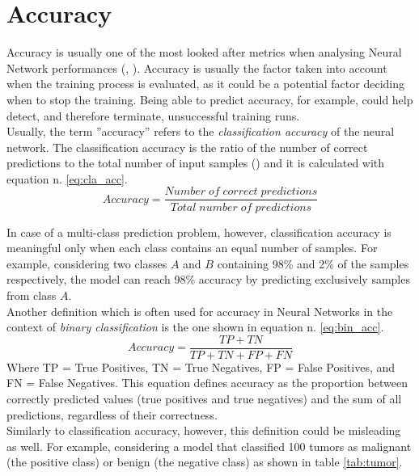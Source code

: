 \section{Accuracy}\label{sec:accuracy}
Accuracy is usually one of the most looked after metrics when analysing Neural Network performances (\cite{hendrycks2019benchmarking}, \cite{bianco2018dnnsbench}). Accuracy is usually the factor taken into account when the training process is evaluated, as it could be a potential factor deciding when to stop the training. Being able to predict accuracy, for example, could help detect, and therefore terminate, unsuccessful training runs. \cite{unterthiner2021predicting} \\
 Usually, the term ''accuracy''  refers to the \textit{classification accuracy} of the neural network. The classification accuracy is the ratio of the number of correct predictions to the total number of input samples (\cite{hussein}) and it is calculated with equation n. \ref{eq:cla_acc}.
\begin{equation}
Accuracy = \dfrac{Number\;of\;correct\;predictions}{Total\;number\;of\;predictions}
\label{eq:cla_acc}    
\end{equation}

In case of a multi-class prediction problem, however, classification accuracy is meaningful only when each class contains an equal number of samples. For example, considering two classes $A$ and $B$ containing 98\% and 2\% of the samples respectively, the model can reach 98\% accuracy by predicting exclusively samples from class $A$. \\
Another definition which is often used for accuracy in Neural Networks in the context of \textit{binary classification} is the one shown in equation n. \ref{eq:bin_acc}.
 \begin{equation}
Accuracy = \dfrac{TP+TN}{TP+TN+FP+FN}
\label{eq:bin_acc}    
\end{equation}
Where TP = True Positives, TN = True Negatives, FP = False Positives, and FN = False Negatives. This equation defines accuracy as the proportion between correctly predicted values (true positives and true negatives) and the sum of all predictions, regardless of their correctness. \\
Similarly to classification accuracy, however, this definition could be misleading as well.  For example, considering a model that classified 100 tumors as malignant (the positive class) or benign (the negative class) as shown in table \ref{tab:tumor}. 

